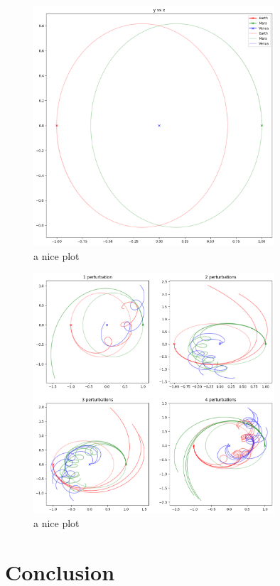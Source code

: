 \documentclass{article}
\begin{document}
\begin{figure}[h!]
    \centering
    \includegraphics[width=0.8\textwidth]{Images/noPerterbations.png}
    \caption{a nice plot}
    \label{fig:mesh2}
\end{figure}

\begin{figure}[h!]
    \centering
    \includegraphics[width=0.8\textwidth]{Images/perterbations1to4.png}
    \caption{a nice plot}
    \label{fig:mesh3}
\end{figure}

\section{Conclusion}
\end{document}
